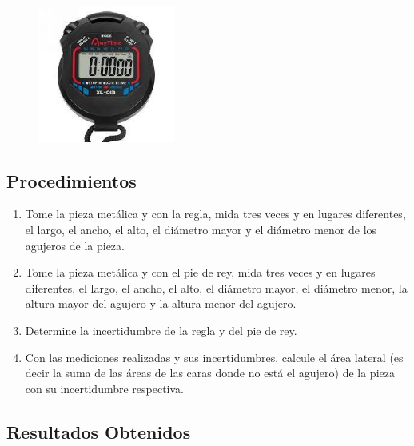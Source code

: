 \begin{figure}[H]
	\begin{center}
		\includegraphics[width = 0.4\textwidth]{Imagenes/crono.jpg}
	\end{center}
\end{figure}

\subsection{Procedimientos}
\begin{enumerate}
	\item  Tome la pieza metálica y con la regla, mida tres veces y en lugares diferentes, el largo, el ancho, el alto, el diámetro mayor y el diámetro menor de los agujeros de la pieza.
	\item Tome la pieza metálica y con el pie de rey, mida tres veces y en lugares diferentes, el largo, el ancho, el alto, el diámetro mayor, el diámetro menor, la altura mayor del agujero y la altura menor del agujero.
	\item Determine la incertidumbre de la regla y del pie de rey.
	\item Con las mediciones realizadas y sus incertidumbres, calcule el  área lateral (es decir la suma de las áreas de las caras donde no está el agujero) de la pieza con su incertidumbre respectiva.

\end{enumerate}
\subsection{Resultados Obtenidos}


